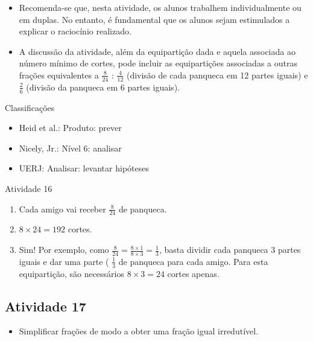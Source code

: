 \documentclass[oneside]{book}
\begin{document}
\begin{multicols}{2}
 
\begin{itemize} %
    \item       Recomenda-se que, nesta atividade, os alunos trabalhem 
individualmente ou em duplas. No entanto, é fundamental que os alunos sejam 
estimulados a explicar o raciocínio realizado.
    \item       A discussão da atividade, além da equipartição dada e aquela 
associada ao número mínimo de cortes, pode incluir as equipartições associadas a 
outras frações equivalentes a       $\frac{8}{24}$      :       $\frac{4}{12}$   
    (divisão de cada panqueca em 12 partes iguais) e       $\frac{2}{6}$       
(divisão da panqueca em 6 partes iguais).
\end{itemize} %
  
  
  Classificações  
\begin{itemize} %
    \item       Heid et al.: Produto: prever
    \item       Nicely, Jr.: Nível 6: analisar
    \item       UERJ: Analisar: levantar hipóteses
\end{itemize} %
  

\begin{resposta*}{Atividade 16}
\begin{enumerate} [\quad a)] %
    \item       Cada amigo vai receber       $\frac{8}{24}$       de panqueca.
    \item             $8 \times 24 = 192$       cortes.
    \item       Sim! Por exemplo, como       $\frac{8}{24} = \frac{8 \times 1}{8 
\times 3} = \frac{1}{3}$, basta dividir cada panqueca       $3$       partes 
iguais e dar uma parte (      $\frac{1}{3}$       de panqueca para cada amigo. 
Para esta equipartição, são necessários       $8 \times 3 = 24$       cortes 
apenas.
\end{enumerate} %
  
\end{resposta*}



\subsection{Atividade 17}

\begin{itemize} %
    \item       Simplificar frações de modo a obter uma fração igual 
irredutível.
\end{itemize} %
  

\end{multicols}
\end{document}
